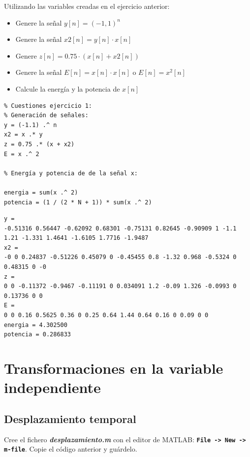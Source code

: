 \documentclass{article}
\begin{document}
Utilizando las variables creadas en el ejercicio anterior:
\begin{itemize}[label=$-$]
	\item Genere la señal $y[n]=(-1,1)^n$
	

	\item Genere la señal $x2[n]=y[n]\cdot x[n]$
	\item Genere $z[n]=0.75\cdot(x[n]+x2[n])$
	\item Genere la señal $E[n]=x[n]\cdot x[n]$ o $E[n]=x^2[n]$
	\item Calcule la energía y la potencia de $x[n]$
\end{itemize}

\pagebreak

\begin{lstlisting}
% Cuestiones ejercicio 1:
% Generación de señales:
y = (-1.1) .^ n
x2 = x .* y
z = 0.75 .* (x + x2)
E = x .^ 2

% Energía y potencia de de la señal x:

energia = sum(x .^ 2)
potencia = (1 / (2 * N + 1)) * sum(x .^ 2)
\end{lstlisting}
\begin{verbatim}
y =
-0.51316 0.56447 -0.62092 0.68301 -0.75131 0.82645 -0.90909 1 -1.1 1.21 -1.331 1.4641 -1.6105 1.7716 -1.9487
x2 =
-0 0 0.24837 -0.51226 0.45079 0 -0.45455 0.8 -1.32 0.968 -0.5324 0 0.48315 0 -0
z =
0 0 -0.11372 -0.9467 -0.11191 0 0.034091 1.2 -0.09 1.326 -0.0993 0 0.13736 0 0
E =
0 0 0.16 0.5625 0.36 0 0.25 0.64 1.44 0.64 0.16 0 0.09 0 0
energia = 4.302500
potencia = 0.286833
\end{verbatim}
\section{Transformaciones en la variable independiente}
\subsection{Desplazamiento temporal}

Cree el fichero \textbf{\textit{desplazamiento.m}} con el editor de MATLAB: \textbf{\texttt{File -> New -> m-file}}. Copie el código anterior y guárdelo.
\end{document}

